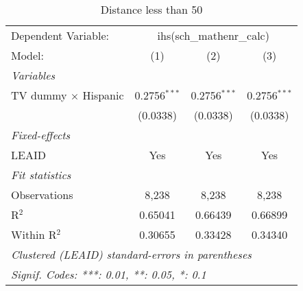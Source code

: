 \begin{table}[htbp]
\centering
\caption{Distance less than 50}
\begin{tabular}{lccc}
\tabularnewline\midrule\midrule
Dependent Variable:&\multicolumn{3}{c}{ihs(sch\_mathenr\_calc)}\\
Model:&(1) & (2) & (3)\\
\midrule \emph{Variables}&   &   &  \\
TV dummy $\times$ Hispanic & 0.2756$^{***}$ & 0.2756$^{***}$ & 0.2756$^{***}$\\
  &(0.0338) & (0.0338) & (0.0338)\\
\midrule \emph{Fixed-effects}&   &   &  \\
LEAID & Yes & Yes & Yes\\
\midrule \emph{Fit statistics}&  & & \\
Observations & 8,238&8,238&8,238\\
R$^2$ & 0.65041&0.66439&0.66899\\
Within R$^2$ & 0.30655&0.33428&0.34340\\
\midrule\midrule\multicolumn{4}{l}{\emph{Clustered (LEAID) standard-errors in parentheses}}\\
\multicolumn{4}{l}{\emph{Signif. Codes: ***: 0.01, **: 0.05, *: 0.1}}\\
\end{tabular}
\end{table}

